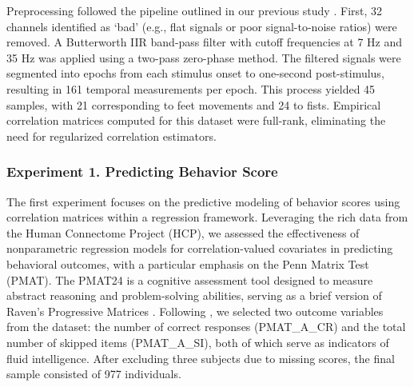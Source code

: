 \documentclass[10pt]{article}
\begin{document}
Preprocessing followed the pipeline outlined in our previous study \citep{you_2022_GeometricLearningFunctional}. First, 32 channels identified as `bad' (e.g., flat signals or poor signal-to-noise ratios) were removed. A Butterworth IIR band-pass filter with cutoff frequencies at 7 Hz and 35 Hz was applied using a two-pass zero-phase method. The filtered signals were segmented into epochs from each stimulus onset to one-second post-stimulus, resulting in 161 temporal measurements per epoch. This process yielded 45 samples, with 21 corresponding to feet movements and 24 to fists. Empirical correlation matrices computed for this dataset were full-rank, eliminating the need for regularized correlation estimators.


\subsubsection{Experiment 1. Predicting Behavior Score}


The first experiment focuses on the predictive modeling of behavior scores using correlation matrices within a regression framework. Leveraging the rich data from the Human Connectome Project (HCP), we assessed the effectiveness of nonparametric regression models for correlation-valued covariates in predicting behavioral outcomes, with a particular emphasis on the Penn Matrix Test (PMAT). The PMAT24 is a cognitive assessment tool designed to measure abstract reasoning and problem-solving abilities, serving as a brief version of Raven's Progressive Matrices \citep{bilker_2012_DevelopmentAbbreviatedNineItem}. Following \cite{you_2021_RevisitingRiemannianGeometry}, we selected two outcome variables from the dataset: the number of correct responses (\textsf{PMAT\_A\_CR}) and the total number of skipped items (\textsf{PMAT\_A\_SI}), both of which serve as indicators of fluid intelligence. After excluding three subjects due to missing scores, the final sample consisted of 977 individuals. 
\end{document}
